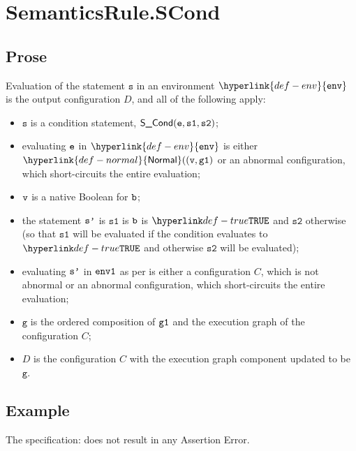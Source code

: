 \documentclass{book}
\newcommand\ProseOrAbnormal[0]{or an abnormal configuration, which short-circuits the entire evaluation}
\newcommand\Normal[0]{\hyperlink{def-normal}{\textsf{Normal}}}
\newcommand\env[0]{\hyperlink{def-env}{\texttt{env}}}
\newcommand\vg[0]{\texttt{g}}
\newcommand\vs[0]{\texttt{s}}
\newcommand\vsone[0]{\texttt{s1}}
\newcommand\vstwo[0]{\texttt{s2}}
\begin{document}

\section{SemanticsRule.SCond \label{sec:SemanticsRule.SCond}}
    \subsection{Prose}
    Evaluation of the statement $\vs$ in an environment $\env$ is
    the output configuration $D$, and all of the following apply:
    \begin{itemize}
    \item $\vs$ is a condition statement, $\SCond(\ve, \vsone, \vstwo)$;
    \item evaluating $\texttt{e}$ in $\env$ is either $\Normal((\vv, \vgone)$ \ProseOrAbnormal;
    \item $\texttt{v}$ is a native Boolean for $\texttt{b}$;
    \item the statement $\texttt{s'}$ is $\vsone$ is $\texttt{b}$ is $\True$ and $\vstwo$ otherwise
    (so that $\vsone$ will be evaluated if the condition evaluates to $\True$ and otherwise
    $\vstwo$ will be evaluated);
    \item evaluating $\texttt{s'}$ in $\texttt{env1}$ as per  is either
    a configuration $C$, which is not abnormal \ProseOrAbnormal;
    \item $\vg$ is the ordered composition of $\texttt{g1}$ and the execution graph of the configuration $C$;
    \item $D$ is the configuration $C$ with the execution graph component updated to be $\vg$.
    \end{itemize}

    \subsection{Example}
    The specification:
    does not result in any Assertion Error.


\end{document}
